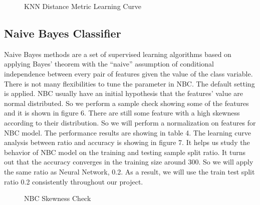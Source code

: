 \documentclass{article} %
\begin{document}
\begin{figure}[H]
\begin{center}
\caption{KNN Distance Metric Learning Curve}
\end{center}
\end{figure}

\subsection{Naive Bayes Classifier}
Naive Bayes methods are a set of supervised learning algorithms based on applying Bayes’ theorem with the “naive” assumption of conditional independence between every pair of features given the value of the class variable. There is not many flexibilities to tune the parameter in NBC. The default setting is applied. NBC usually have an initial hypothesis that the features' value are normal distributed. So we perform a sample check showing some of the features and it is shown in figure 6. There are still some feature with a high skewness according to their distribution. So we will perform a normalization on features for NBC model. The performance results are showing in table 4. The learning curve analysis between ratio and accuracy is showing in figure 7. It helps us study the behavior of NBC model on the training and testing sample split ratio. It turns out that the accuracy converges in the training size around 300. So we will apply the same ratio as Neural Network, 0.2. As a result, we will use the train test split ratio 0.2 consistently throughout our project. 

\begin{figure}[H]
\begin{center}
\caption{NBC Skewness Check}
\end{center}
\end{figure}
\end{document}
